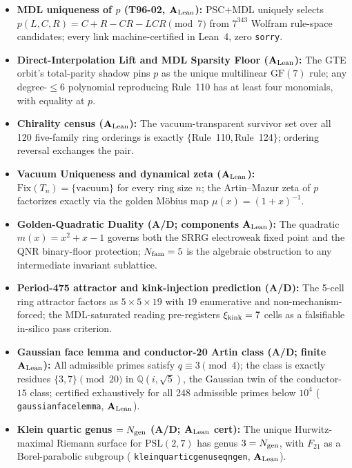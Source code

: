 \documentclass[11pt]{article}
\theoremstyle{remark}
\newcommand{\lean}[1]{%
  \penalty-100
  \begingroup\def\_{\textunderscore\allowbreak}\texttt{#1}\endgroup}
\newcommand{\CatAL}{\texorpdfstring{\ensuremath{\textbf{A}_{\rm Lean}}}{A-Lean}}
\newcommand{\CatAD}{\textbf{A/D}}
\begin{document}
\medskip
\begin{tcolorbox}[colback=orange!6,colframe=orange!70!black,
  title={\textbf{What this paper claims}},
  fonttitle=\bfseries,left=6pt,right=6pt,top=5pt,bottom=5pt]
\small
\begin{itemize}[noitemsep,topsep=2pt,leftmargin=1.4em]
  \item \textbf{MDL uniqueness of $p$ (T96-02, \CatAL{}):} PSC+MDL uniquely
        selects $p(L,C,R)=C+R-CR-LCR \pmod{7}$ from $7^{343}$ Wolfram
        rule-space candidates; every link machine-certified in Lean~4, zero
        \texttt{sorry}.
  \item \textbf{Direct-Interpolation Lift and MDL Sparsity Floor (\CatAL{}):}
        The GTE orbit's total-parity shadow pins $p$ as the unique multilinear
        $\mathrm{GF}(7)$ rule; any degree-${\leq}6$ polynomial reproducing
        Rule~110 has at least four monomials, with equality at $p$.
  \item \textbf{Chirality census (\CatAL{}):} The vacuum-transparent survivor
        set over all 120 five-family ring orderings is exactly
        $\{$Rule~110,\,Rule~124$\}$; ordering reversal exchanges the pair.
  \item \textbf{Vacuum Uniqueness and dynamical zeta (\CatAL{}):}
        $\mathrm{Fix}(T_n) = \{\text{vacuum}\}$ for every ring size $n$; the
        Artin--Mazur zeta of $p$ factorizes exactly via the golden M\"{o}bius
        map $\mu(x)=(1+x)^{-1}$.
  \item \textbf{Golden-Quadratic Duality (\CatAD{}; components \CatAL{}):}
        The quadratic $m(x)=x^2+x-1$ governs both the SRRG electroweak
        fixed point and the QNR binary-floor protection; $N_{\rm fam}=5$ is
        the algebraic obstruction to any intermediate invariant sublattice.
  \item \textbf{Period-475 attractor and kink-injection prediction (\CatAD{}):}
        The 5-cell ring attractor factors as $5\times5\times19$ with $19$
        enumerative and non-mechanism-forced; the MDL-saturated reading
        pre-registers $\xi_{\rm kink}=7$ cells as a falsifiable in-silico
        pass criterion.
  \item \textbf{Gaussian face lemma and conductor-20 Artin class (\CatAD{}; finite \CatAL{}):}
        All admissible primes satisfy $q \equiv 3 \pmod{4}$; the class is
        exactly residues $\{3,7\} \pmod{20}$ in $\mathbb{Q}(i,\sqrt{5})$, the
        Gaussian twin of the conductor-$15$ class; certified exhaustively for all
        248 admissible primes below $10^4$
        (\lean{gaussian\_face\_lemma}, \CatAL{}).
  \item \textbf{Klein quartic genus $= N_{\rm gen}$ (\CatAD{}; \CatAL{} cert):}
        The unique Hurwitz-maximal Riemann surface for $\mathrm{PSL}(2,7)$ has
        genus $3 = N_{\rm gen}$, with $F_{21}$ as a Borel-parabolic subgroup
        (\lean{klein\_quartic\_genus\_eq\_n\_gen}, \CatAL{}).
\end{itemize}
\end{tcolorbox}
\end{document}
